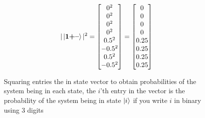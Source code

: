 \begin{figure}[H]
    \centering
    \begin{gather*}
        |\ket{\mathbf{1}\textbf{+}\textbf{--}}|^2=
        \begin{bmatrix}
            0^2\\
            0^2\\
            0^2\\
            0^2\\
            0.5^2\\
            -0.5^2\\
            0.5^2\\
            -0.5^2\\
        \end{bmatrix}
        =
        \begin{bmatrix}
            0\\
            0\\
            0\\
            0\\
            0.25\\
            0.25\\
            0.25\\
            0.25\\
        \end{bmatrix}
    \end{gather*}
    \caption{Squaring entries the in state vector to obtain probabilities of the system being in each state, the $i$'th entry in the vector is the probability of the system being in state $\ket{i}$ if you write $i$ in binary using 3 digits}
    \label{fig:square_state}
\end{figure}

